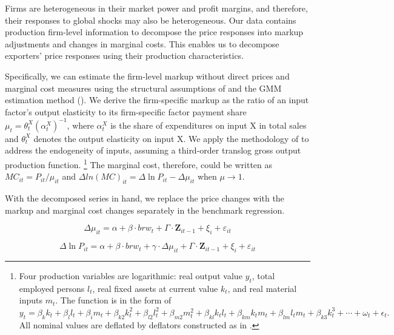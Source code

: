 Firms are heterogeneous in their market power and profit margins, and therefore, their responses to global shocks may also be heterogeneous. Our data contains production firm-level information to decompose the price responses into markup adjustments and changes in marginal costs. This enables us to decompose exporters' price responses using their production characteristics.

Specifically, we can estimate the firm-level markup without direct prices and marginal cost measures using the structural assumptions of \cite{deloecker2012markups} and the GMM estimation method (\cite{brooks2021agglomeration}). We derive the firm-specific markup as the ratio of an input factor's output elasticity to its firm-specific factor payment share $\mu_{t}=\theta_{t}^{X}\left(\alpha_{t}^{X}\right)^{-1}$, where $\alpha_{t}^{X}$ is the share of expenditures on input X in total sales and $\theta^X_t$ denotes the output elasticity on input X. We apply the methodology of \cite{ackerberg2015} to address the endogeneity of inputs, assuming a third-order translog gross output production function. \footnote{Four production variables are logarithmic: real output value $y_t$, total employed persons $l_t$, real fixed assets at current value $k_t$, and real material inputs $m_t$. The function is in the form of $
    y_{t}= \beta_{k} k_{t}+\beta_{l} l_{t}+\beta_{i} m_{t}+\beta_{k 2} k_{t}^{2}+\beta_{l 2} l_{t}^{2}+\beta_{m 2} m_{t}^{2}+\beta_{k l} k_{ t} l_{t}+\beta_{k m} k_{t} m_{t}+\beta_{l m} l_{t} m_{t} + \beta_{k 3} k_{t}^{3}+\cdots+\omega_{t}+\epsilon_{t}.
$
All nominal values are deflated by deflators constructed as in \cite{brandt2012}.} The marginal cost, therefore, could be written as $MC_{it}=P_{it} / \mu_{it}$ and $\Delta ln(MC)_{it}= \Delta \ln P_{it} - \Delta \mu_{it}$ when $\mu \rightarrow 1$. 

With the decomposed series in hand, we replace the price changes with the markup and marginal cost changes separately in the benchmark regression. 

\begin{equation}
    \Delta \mu_{it} = \alpha +\beta \cdot brw_{t}+ \Gamma \cdot \textbf{Z}_{it-1}+\xi_{i}+\varepsilon_{it} \label{reg.markup}
\end{equation}

\begin{equation}
    \Delta \ln P_{it} = \alpha+\beta \cdot brw_{t}+ \gamma \cdot \Delta \mu_{it}+ \Gamma \cdot \textbf{Z}_{it-1}+\xi_{i}+\varepsilon_{i t} \label{reg.markup_int}
\end{equation}


